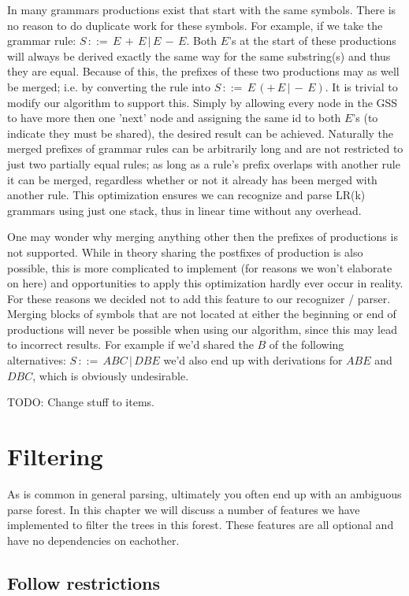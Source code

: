 \documentclass[a4paper,10pt]{article}
\begin{document}
In many grammars productions exist that start with the same symbols. There is no reason to do duplicate work for these symbols. For example, if we take the grammar rule: $S\,::=\,E\,+\,E\,|\,E\,-\,E$. Both $E$'s at the start of these productions will always be derived exactly the same way for the same substring(s) and thus they are equal. Because of this, the prefixes of these two productions may as well be merged; i.e. by converting the rule into $S\,::=\,E\,(+\,E\,|\,-\,E)$. It is trivial to modify our algorithm to support this. Simply by allowing every node in the GSS to have more then one 'next' node and assigning the same id to both $E$'s (to indicate they must be shared), the desired result can be achieved. Naturally the merged prefixes of grammar rules can be arbitrarily long and are not restricted to just two partially equal rules; as long as a rule's prefix overlaps with another rule it can be merged, regardless whether or not it already has been merged with another rule. This optimization ensures we can recognize and parse LR(k) grammars using just one stack, thus in linear time without any overhead.

One may wonder why merging anything other then the prefixes of productions is not supported. While in theory sharing the postfixes of production is also possible, this is more complicated to implement (for reasons we won't elaborate on here) and opportunities to apply this optimization hardly ever occur in reality. For these reasons we decided not to add this feature to our recognizer / parser. Merging blocks of symbols that are not located at either the beginning or end of productions will never be possible when using our algorithm, since this may lead to incorrect results. For example if we'd shared the $B$ of the following alternatives: $S\,::=\,ABC\,|\,DBE$ we'd also end up with derivations for $ABE$ and $DBC$, which is obviously undesirable.

TODO: Change stuff to items.

\section{Filtering}

As is common in general parsing, ultimately you often end up with an ambiguous parse forest. In this chapter we will discuss a number of features we have implemented to filter the trees in this forest. These features are all optional and have no dependencies on eachother.

\subsection{Follow restrictions}
\end{document}
